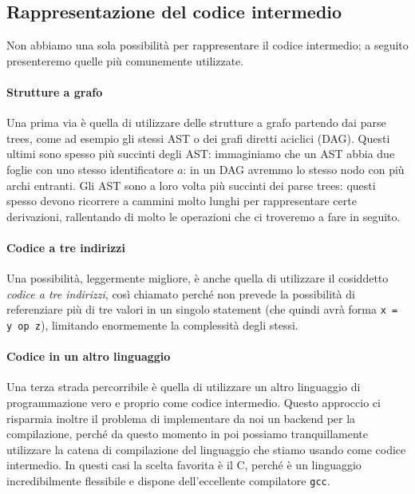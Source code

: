 \documentclass[class=book, crop=false, oneside, 12pt]{standalone}
\begin{document}
\subsection{Rappresentazione del codice intermedio}
Non abbiamo una sola possibilità per rappresentare il codice intermedio; a seguito presenteremo quelle più comunemente utilizzate.

\paragraph{Strutture a grafo}
Una prima via è quella di utilizzare delle strutture a grafo partendo dai parse trees, come ad esempio gli stessi AST o dei grafi diretti aciclici (DAG). Questi ultimi sono spesso più succinti degli AST: immaginiamo che un AST abbia due foglie con uno stesso identificatore \(a\): in un DAG avremmo lo stesso nodo con più archi entranti. Gli AST sono a loro volta più succinti dei parse trees: questi spesso devono ricorrere a cammini molto lunghi per rappresentare certe derivazioni, rallentando di molto le operazioni che ci troveremo a fare in seguito.

\paragraph{Codice a tre indirizzi}
Una possibilità, leggermente migliore, è anche quella di utilizzare il cosiddetto \emph{codice a tre indirizzi}, così chiamato perché non prevede la possibilità di referenziare più di tre valori in un singolo statement (che quindi avrà forma \texttt{x = y op z}), limitando enormemente la complessità degli stessi.

\paragraph{Codice in un altro linguaggio}
Una terza strada percorribile è quella di utilizzare un altro linguaggio di programmazione vero e proprio come codice intermedio. Questo approccio ci risparmia inoltre il problema di implementare da noi un backend per la compilazione, perché da questo momento in poi possiamo tranquillamente utilizzare la catena di compilazione del linguaggio che stiamo usando come codice intermedio. In questi casi la scelta favorita è il C, perché è un linguaggio incredibilmente flessibile e dispone dell'eccellente compilatore \texttt{gcc}.
\end{document}
